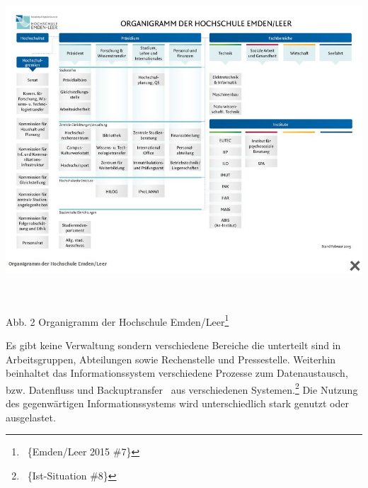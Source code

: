 \documentclass{article}
\begin{document}
\begin{center}
\includegraphics[width=16.926cm,height=11.885cm]{INMGruppe6TeilCIO-img/INMGruppe6TeilCIO-img002.jpg}
\end{center}

\bigskip


\bigskip


\bigskip


\bigskip


\bigskip


\bigskip


\bigskip


\bigskip


\bigskip


\bigskip


\bigskip

Abb. 2 Organigramm der Hochschule Emden/Leer\footnote{\ \{Emden/Leer 2015 \#7\}} 

\newline
\newline
\newline
\newline
\newline
Es gibt keine Verwaltung sondern verschiedene Bereiche die unterteilt sind in Arbeitsgruppen, Abteilungen sowie
Rechenstelle und Pressestelle. Weiterhin beinhaltet das Informationssystem verschiedene Prozesse zum Datenaustausch,
bzw. Datenfluss und Backuptransfer \ aus verschiedenen Systemen.\footnote{\ \{Ist-Situation \#8\}} Die Nutzung des
gegenwärtigen Informationssystems wird unterschiedlich stark genutzt oder ausgelastet. 
\end{document}
